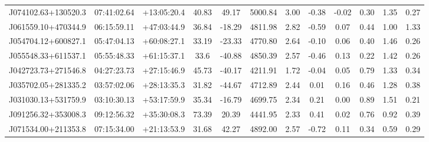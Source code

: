 \documentclass[a4paper,fleqn,usenatbib]{mnras}
\begin{document}
\begin{table}
\begin{tabular}{@{}cccccccccccc@{}}
			J074102.63+130520.3 & 07:41:02.64 & +13:05:20.4  & 40.83               	& 49.17               	& 5000.84             	& 3.00           	& -0.38              	& -0.02                  	& 0.30                     	& 1.35             	& 0.27       	\\
			J061559.10+470344.9 & 06:15:59.11 & +47:03:44.9  & 36.84               	& -18.29              	& 4811.98             	& 2.82           	& -0.59              	& 0.07                   	& 0.44                     	& 1.00             	& 1.33       	\\
			J054704.12+600827.1 & 05:47:04.13 & +60:08:27.1  & 33.19               	& -23.33              	& 4770.80             	& 2.64           	& -0.10              	& 0.06                   	& 0.40                     	& 1.46             	& 0.26       	\\
			J055548.33+611537.1 & 05:55:48.33 & +61:15:37.1  & 33.6                	& -40.88              	& 4850.39             	& 2.57           	& -0.46              	& 0.13                   	& 0.22                     	& 1.42             	& 0.26       	\\
			J042723.73+271546.8 & 04:27:23.73 & +27:15:46.9  & 45.73               	& -40.17              	& 4211.91             	& 1.72           	& -0.04              	& 0.05                   	& 0.79                     	& 1.33             	& 0.34       	\\
			J035702.05+281335.2 & 03:57:02.06 & +28:13:35.3  & 31.82               	& -44.67              	& 4712.89             	& 2.44           	& 0.01               	& 0.16                   	& 0.46                     	& 1.28             	& 0.38       	\\
			J031030.13+531759.9 & 03:10:30.13 & +53:17:59.9  & 35.34               	& -16.79              	& 4699.75             	& 2.34           	& 0.21               	& 0.00                   	& 0.89                     	& 1.51             	& 0.21       	\\
			J091256.32+353008.3 & 09:12:56.32 & +35:30:08.3  & 73.39               	& 20.39               	& 4441.95             	& 2.33           	& 0.41               	& 0.02                   	& 0.76                     	& 0.92             	& 0.39       	\\
			J071534.00+211353.8 & 07:15:34.00 & +21:13:53.9  & 31.68               	& 42.27               	& 4892.00             	& 2.57           	& -0.72              	& 0.11                   	& 0.34                     	& 0.59             	& 0.29       	\\

\end{tabular}
\end{table}
\end{document}
